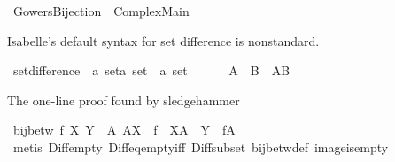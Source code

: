 %
\begin{isabellebody}%
%
%
\isadelimdocument
%
\endisadelimdocument
%
\isatagdocument
%
\isamarkuptrue%
%
\endisatagdocument
{\isafolddocument}%
%
\isadelimdocument
%
\endisadelimdocument
%
\isadelimtheory
%
\endisadelimtheory
%
\isatagtheory
{}\isamarkupfalse%
\ Gowers{\isacharunderscore}{\kern0pt}Bijection\ \ Complex{\isacharunderscore}{\kern0pt}Main\isanewline
\ \ \ \isanewline
{}%
\endisatagtheory
{\isafoldtheory}%
%
\isadelimtheory
%
\endisadelimtheory
%
\begin{isamarkuptext}%
Isabelle's default syntax for set difference is nonstandard.%
\end{isamarkuptext}\isamarkuptrue%
\isamarkupfalse%
\ set{\isacharunderscore}{\kern0pt}difference\ {\isacharcolon}{\kern0pt}{\isacharcolon}{\kern0pt}\ {\isachardoublequoteopen}{\isacharbrackleft}{\kern0pt}{\isacharprime}{\kern0pt}a\ set{\isacharcomma}{\kern0pt}{\isacharprime}{\kern0pt}a\ set{\isacharbrackright}{\kern0pt}\ {\isasymRightarrow}\ {\isacharprime}{\kern0pt}a\ set{\isachardoublequoteclose}\ {\isacharparenleft}{\kern0pt}\ {\isachardoublequoteopen}{\isasymsetminus}{\isachardoublequoteclose}\ {}{}{\isacharparenright}{\kern0pt}\isanewline
\ \ \ {\isachardoublequoteopen}A\ {\isasymsetminus}\ B\ {\isasymequiv}\ A{\isacharminus}{\kern0pt}B{\isachardoublequoteclose}%
\begin{isamarkuptext}%
The one-line proof found by sledgehammer%
\end{isamarkuptext}\isamarkuptrue%
\isamarkupfalse%
\ {\isachardoublequoteopen}bij{\isacharunderscore}{\kern0pt}betw\ f\ X\ Y\ {\isasymlongleftrightarrow}\ {\isacharparenleft}{\kern0pt}{\isasymforall}A{\isachardot}{\kern0pt}\ A{\isasymsubseteq}X\ {\isasymlongrightarrow}\ f\ {\isacharbackquote}{\kern0pt}\ {\isacharparenleft}{\kern0pt}X{\isasymsetminus}A{\isacharparenright}{\kern0pt}\ {\isacharequal}{\kern0pt}\ Y\ {\isasymsetminus}\ f{\isacharbackquote}{\kern0pt}A{\isacharparenright}{\kern0pt}{\isachardoublequoteclose}\isanewline
%
\isadelimproof
\ \ %
\endisadelimproof
%
\isatagproof
{}\isamarkupfalse%
\ {\isacharparenleft}{\kern0pt}metis\ Diff{\isacharunderscore}{\kern0pt}empty\ Diff{\isacharunderscore}{\kern0pt}eq{\isacharunderscore}{\kern0pt}empty{\isacharunderscore}{\kern0pt}iff\ Diff{\isacharunderscore}{\kern0pt}subset\ bij{\isacharunderscore}{\kern0pt}betw{\isacharunderscore}{\kern0pt}def\ image{\isacharunderscore}{\kern0pt}is{\isacharunderscore}{\kern0pt}empty\ \isanewline

\end{isabellebody}
